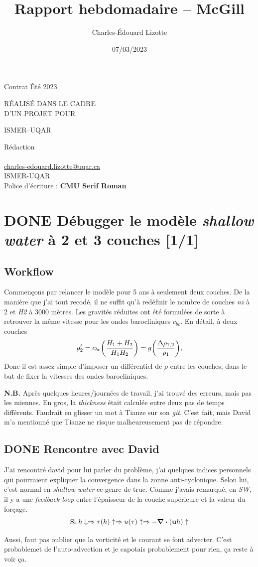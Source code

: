 \documentclass[10pt]{article}
\author{Charles-Édouard Lizotte}
\date{07/03/2023}
\title{Rapport hebdomadaire -- McGill}
\makeatletter
\numberwithin{equation}{section}
\newcommand{\mytitlepage}{
\begin{titlepage}
\begin{center}
{\Huge \thesubtitle \par}
\vspace{2cm}
{\Huge \MakeUppercase{\thetitle} \par}
\vspace{2cm}
RÉALISÉ DANS LE CADRE\\ D'UN PROJET POUR \par
\vspace{2cm}
{\Huge ISMER--UQAR \par}
\vspace{2cm}
{\thedate}
\end{center}
\vfill
Rédaction \\
{\theauthor}\\
\url{charles-edouard.lizotte@uqar.ca}\\
ISMER-UQAR\\
Police d'écriture : \textbf{CMU Serif Roman}
\end{titlepage}
}
\newcommand{\thesubtitle}{Contrat Été 2023}
\makeatother
\begin{document}
\mytitlepage
\tableofcontents\newpage
\section{{\bfseries\sffamily DONE} Débugger le modèle \emph{shallow water} à 2 et 3 couches [1/1]}
\label{sec:org643444a}
\subsection{Workflow}
\label{sec:org91e4734}
Commençons par relancer le modèle pour 5 ans à seulement deux couches.
De la manière que j'ai tout recodé, il ne suffit qu'à redéfinir le nombre de couches \emph{nz} à 2 et \emph{H2} à 3000 mètres.
Les gravités réduites ont été formulées de sorte à retrouver la même vitesse pour les ondes barocliniques \(c_{bc}\).
En détail, à deux couches
\begin{equation}
g_2' = c_{bc} \qty(\frac{H_1+H_2}{H_1H_2}) = g \qty(\frac{\Delta \rho_{1,2}}{\rho_1}),
\end{equation}
Donc il est assez simple d'imposer un différentiel de \(\rho\) entre les couches, dans le but de fixer la vitesses des ondes barocliniques.

\textbf{N.B.} Après quelques heures/journées de travail, j'ai trouvé des erreurs, mais pas les miennes.
En gros, la \emph{thickness} était calculée entre deux pas de temps différents.
Faudrait en glisser un mot à Tianze sur son \emph{git}.
C'est fait, mais David m'a mentionné que Tianze ne risque malheureusement pas de répondre.
\subsection{{\bfseries\sffamily DONE} Rencontre avec David}
\label{sec:org30812bf}
J'ai rencontré david pour lui parler du problème, j'ai quelques indices personnels qui pourraient expliquer la convergence dans la zonne anti-cyclonique. 
Selon lui, c'est normal en \emph{shallow water} ce genre de truc.
Comme j'avais remarqué, en \emph{SW}, il y a une \emph{feedback loop} entre l'épaisseur de la couche supérieure et la valeur du forçage.
\begin{equation}
\text{Si } h \downarrow
\Rightarrow \tau (h) \uparrow
\Rightarrow u(\tau) \uparrow
\Rightarrow -\divergence(\vb{u}h) \uparrow
\end{equation}

Aussi, faut pas oublier que la vorticité et le courant se font advecter.
C'est probablemet de l'auto-advection et je capotais probablement pour rien, ça reste à voir ça.\\
\end{document}
